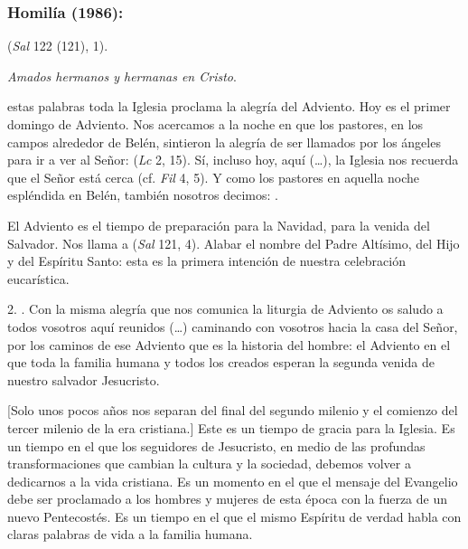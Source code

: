 \subsubsection{Homilía (1986):}


\begin{body}
	 (\emph{Sal} 122 (121), 1). 
	
	\emph{Amados hermanos y hermanas en Cristo}. 
	
	 estas palabras toda la Iglesia proclama la alegría del Adviento. Hoy es el primer domingo de Adviento. Nos acercamos a la noche en que los pastores, en los campos alrededor de Belén, sintieron la alegría de ser llamados por los ángeles para ir a ver al Señor:  (\emph{Lc} 2, 15). Sí, incluso hoy, aquí (\ldots{}), la Iglesia nos recuerda que el Señor está cerca (cf. \emph{Fil} 4, 5). Y como los pastores en aquella noche espléndida en Belén, también nosotros decimos: .
	
	El Adviento es el tiempo de preparación para la Navidad, para la venida del Salvador. Nos llama a  (\emph{Sal} 121, 4). Alabar el nombre del Padre Altísimo, del Hijo y del Espíritu Santo: esta es la primera intención de nuestra celebración eucarística.
	
	2. . Con la misma alegría que nos comunica la liturgia de Adviento os saludo a todos vosotros aquí reunidos (\ldots{}) caminando con vosotros hacia la casa del Señor, por los caminos de ese Adviento que es la historia del hombre: el Adviento en el que toda la familia humana y todos los creados esperan la segunda venida de nuestro salvador Jesucristo.
	
	{[}Solo unos pocos años nos separan del final del segundo milenio y el comienzo del tercer milenio de la era cristiana.{]} Este es un tiempo de gracia para la Iglesia. Es un tiempo en el que los seguidores de Jesucristo, en medio de las profundas transformaciones que cambian la cultura y la sociedad, debemos volver a dedicarnos a la vida cristiana. Es un momento en el que el mensaje del Evangelio debe ser proclamado a los hombres y mujeres de esta época con la fuerza de un nuevo Pentecostés. Es un tiempo en el que el mismo Espíritu de verdad habla con claras palabras de vida a la familia humana.
	

\end{body}
